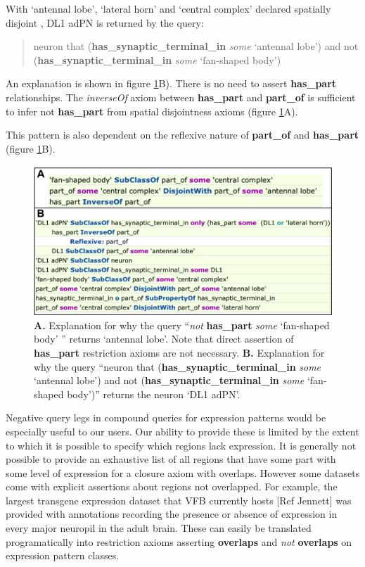 \documentclass[runningheads,a4paper]{llncs}
\begin{document}
With `antennal lobe', `lateral horn' and  `central complex' declared
spatially disjoint , DL1 adPN is returned by the query:

\begin{quote}
neuron that (\textbf{has\_synaptic\_terminal\_in} \textit{some}
`antennal lobe') and not (\textbf{has\_synaptic\_terminal\_in}
\textit{some} `fan-shaped body') 
\end{quote}

An explanation is shown in figure \ref{fig:combined_explanation}B).  There is no need to assert \textbf{has\_part} relationships. The
\textit{inverseOf} axiom between \textbf{has\_part} and
\textbf{part\_of} is sufficient to infer not \textbf{has\_part} from
spatial disjointness axioms (figure \ref{fig:combined_explanation}A).

This pattern is also dependent on the reflexive nature of
\textbf{part\_of} and \textbf{has\_part} (figure \ref{fig:combined_explanation}B).

\begin{figure}
\centering
\includegraphics[width=120mm]{images/combined_explanation.png}
\caption{\textbf{A.} Explanation for why the query ``\textit{not}
   \textbf{has\_part} \textit{some} `fan-shaped body' '' returns
   `antennal lobe'.  Note that direct assertion of \textbf{has\_part}
   restriction axioms are not necessary. \textbf{B.} Explanation for
   why the query ``neuron that (\textbf{has\_synaptic\_terminal\_in}
   \textit{some} `antennal lobe') and not
   (\textbf{has\_synaptic\_terminal\_in} \textit{some} `fan-shaped
   body')'' returns the neuron `DL1 adPN'. }
\label{fig:combined_explanation}
\end{figure}

Negative query legs in compound queries for expression patterns would
be especially useful to our users.  Our ability to provide these is
limited by the extent to which it is possible to specify which regions
lack expression.  It is generally not possible to provide an
exhaustive list of all regions that have some part with some level of
expression for a closure axiom with overlaps.  However some datasets
come with explicit assertions about regions not overlapped.  For
example, the largest transgene expression dataset that VFB currently
hosts [Ref Jennett] was provided with annotations recording the
presence or absence of expression in every major neuropil in the adult
brain.  These can easily be translated programatically into restriction axioms
asserting \textbf{overlaps} and \textit{not} \textbf{overlaps} on
expression pattern classes. %
\end{document}

